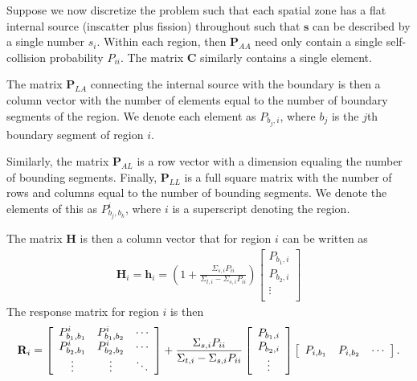 Suppose we now discretize the problem such that each spatial zone has a flat internal source (inscatter plus fission) throughout such that $\mathbf{s}$ can be described by a single number $s_i$. Within each region, then $\mathbf{P}_{AA}$ need only contain a single self-collision probability $P_{ii}$. The matrix $\mathbf{C}$ similarly contains a single element. 

The matrix $\mathbf{P}_{LA}$ connecting the internal source with the boundary is then a column vector with the number of elements equal to the number of boundary segments of the region. We denote each element as $P_{b_j,i}$, where $b_j$ is the $j$th boundary segment of region $i$.

Similarly, the matrix $\mathbf{P}_{AL}$ is a row vector with a dimension equaling the number of bounding segments. Finally, $\mathbf{P}_{LL}$ is a full square matrix with the number of rows and columns equal to the number of bounding segments. We denote the elements of this as $P_{b_j,b_k}^i$, where $i$ is a superscript denoting the region.

The matrix $\mathbf{H}$ is then a column vector that for region $i$ can be written as
\begin{align}
  \mathbf{H}_i = \mathbf{h}_i =  \left( 1 + \frac{ \Sigma_{s,i} P_{ii} }{ \Sigma_{t,i} - \Sigma_{s,i} P_{ii} } \right) \left[ \begin{array}{c} P_{b_1,i} \\ P_{b_2,i} \\ \vdots  \\ \end{array} \right]
\end{align}
The response matrix for region $i$ is then
\begin{align}
  \mathbf{R}_i = 
  \left[ \begin{array}{c c c}
  P_{b_1,b_1}^i & P_{b_1,b_2}^i & \cdots \\
  P_{b_2,b_1}^i & P_{b_2,b_2}^i & \cdots \\
  \vdots        & \vdots        & \ddots \\ \end{array} \right]
  + \frac{ \Sigma_{s,i} P_{ii} }{ \Sigma_{t,i} - \Sigma_{s,i} P_{ii} }
   \left[ \begin{array}{c} P_{b_1,i} \\ P_{b_2,i} \\ \vdots  \\ \end{array} \right]
    \left[ \begin{array}{c c c} P_{i,b_1} & P_{i,b_2} & \cdots  \\ \end{array} \right] .
\end{align}

